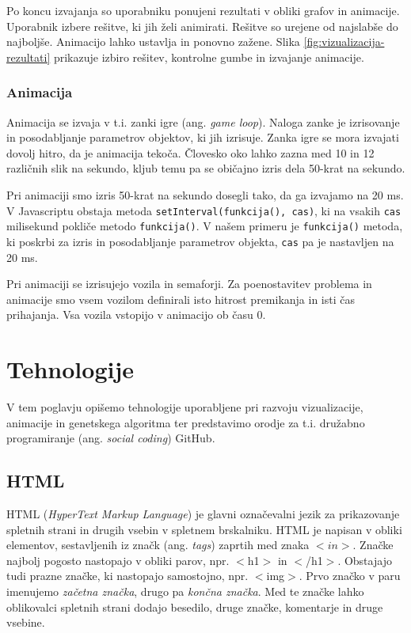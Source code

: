 \documentclass[a4paper, 12pt]{book}
\begin{document}
Po koncu izvajanja so uporabniku ponujeni rezultati v obliki grafov in animacije. Uporabnik izbere re\v sitve, ki jih \v zeli animirati. Re\v sitve so urejene od najslab\v se do najbolj\v se. Animacijo lahko ustavlja in ponovno za\v zene. Slika \ref{fig:vizualizacija-rezultati} prikazuje izbiro re\v sitev, kontrolne gumbe in izvajanje animacije.


\subsection{Animacija}
Animacija se izvaja v t.i. zanki igre (ang. \textit{game loop}). Naloga zanke je izrisovanje in posodabljanje parametrov objektov, ki jih izrisuje. Zanka igre se mora izvajati dovolj hitro, da je animacija teko\v ca. \v Clovesko oko lahko zazna med 10 in 12 razli\v cnih slik na sekundo, kljub temu pa se obi\v cajno izris dela 50-krat na sekundo.

Pri animaciji smo izris 50-krat na sekundo dosegli tako, da ga izvajamo na 20 ms. V Javascriptu obstaja metoda \verb+setInterval(funkcija(), cas)+, ki na vsakih \verb+cas+ milisekund pokli\v ce metodo \verb+funkcija()+. V na\v sem primeru je \verb+funkcija()+ metoda, ki poskrbi za izris in posodabljanje parametrov objekta, \verb+cas+ pa je nastavljen na 20 ms.

Pri animaciji se izrisujejo vozila in semaforji.  Za poenostavitev problema in  animacije smo vsem vozilom definirali isto hitrost premikanja in isti \v cas prihajanja. Vsa vozila vstopijo v animacijo ob \v casu 0.

\chapter{Tehnologije}
\label{ch3}
V tem poglavju opi\v semo tehnologije uporabljene pri razvoju vizualizacije, animacije in genetskega algoritma ter predstavimo orodje za t.i. dru\v zabno programiranje (ang. \textit{social coding}) GitHub.

\section{HTML}

HTML (\textit{HyperText Markup Language}) je glavni ozna\v cevalni jezik za prikazovanje spletnih strani in drugih vsebin v spletnem brskalniku.
HTML je napisan v obliki elementov, sestavljenih iz zna\v ck (ang. \textit{tags}) zaprtih med znaka $< in >$. Zna\v cke najbolj pogosto nastopajo v obliki parov, npr. $<$h1$>$ in $<$/h1$>$. Obstajajo tudi prazne zna\v cke, ki nastopajo samostojno, npr. $<$img$>$. Prvo zna\v cko v paru imenujemo \textit{za\v cetna zna\v cka}, drugo pa \textit{kon\v cna zna\v cka}. Med te zna\v cke lahko oblikovalci spletnih strani dodajo besedilo, druge zna\v cke, komentarje in druge vsebine.
\end{document}
